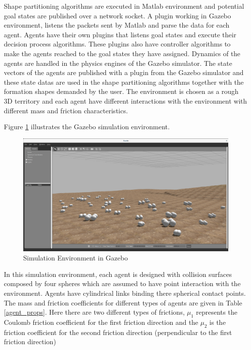 Shape partitioning algorithms are executed in Matlab environment and  potential goal states are published over a network socket. A plugin working in Gazebo environment, listens the packets sent by Matlab and parse the data for each agent. Agents have their own plugins that listens goal states and execute their decision process algorithms. These plugins also have controller algorithms to make the agents reached to the goal states they have assigned. Dynamics of the agents are handled in the physics engines of the Gazebo simulator. The state vectors of the agents are published with a plugin from the Gazebo simulator and these state datas are used in the shape partitioning algorithms together with the formation shapes demanded by the user.   The environment is chosen as a rough 3D territory and each agent have different interactions with the environment with different mass and friction characteristics.

Figure \ref{Gazebo} illustrates the Gazebo simulation environment. 

\begin{figure}[H]
\caption{Simulation Environment in Gazebo} \label{Gazebo}
\centerline{\includegraphics[scale = 0.22]{gazebo_env}}
\end{figure} 

In this simulation environment, each agent is designed with collision surfaces composed by four spheres which are assumed to have point interaction with the environment. Agents have 
cylindrical links binding there spherical contact points. The mass and friction coefficients for different types of agents are given in Table \ref{agent_props}. Here there are two different types of frictions, $\mu_1$ represents the Coulomb friction coefficient for the first friction direction and the $\mu_2$ is the friction coefficient for the second friction direction (perpendicular to the first friction direction)

